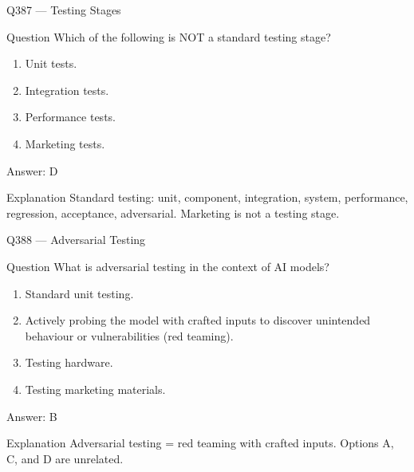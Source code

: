 \documentclass[aspectratio=169,8pt]{beamer}
\begin{document}
	\begin{frame}{Q387 --- Testing Stages}
		\begin{block}{Question}
			Which of the following is NOT a standard testing stage?
			\begin{enumerate}
				\item Unit tests.
				\item Integration tests.
				\item Performance tests.
				\item Marketing tests.
			\end{enumerate}
		\end{block}
		\begin{exampleblock}{Answer: D}\end{exampleblock}
		\begin{block}{Explanation}
			Standard testing: unit, component, integration, system, performance, regression, acceptance, adversarial. Marketing is not a testing stage.
		\end{block}
	\end{frame}
	
	\begin{frame}{Q388 --- Adversarial Testing}
		\begin{block}{Question}
			What is adversarial testing in the context of AI models?
			\begin{enumerate}
				\item Standard unit testing.
				\item Actively probing the model with crafted inputs to discover unintended behaviour or vulnerabilities (red teaming).
				\item Testing hardware.
				\item Testing marketing materials.
			\end{enumerate}
		\end{block}
		\begin{exampleblock}{Answer: B}\end{exampleblock}
		\begin{block}{Explanation}
			Adversarial testing = red teaming with crafted inputs. Options A, C, and D are unrelated.
		\end{block}
	\end{frame}
	
\end{document}
